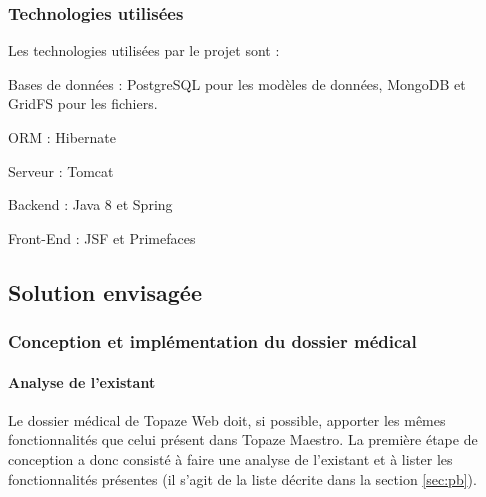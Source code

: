 \subsubsection{Technologies utilisées}
Les technologies utilisées par le projet sont :
\begin{sitemize}
\item Bases de données : \gls{PostgreSQL} pour les modèles de données, \gls{MongoDB} et \gls{GridFS} pour les fichiers.
\item ORM : \gls{Hibernate}\cite{bib:hibernate}
\item Serveur : \gls{Tomcat}
\item Backend : \gls{Java 8}\cite{bib:java8} et \gls{Spring}\cite{bib:spring}
\item Front-End : \gls{JSF}\cite{bib:jsf} et Primefaces
\end{sitemize} 

\subsection{Solution envisagée}
\subsubsection{Conception et implémentation du dossier médical}

\paragraph{Analyse de l'existant\\}
Le dossier médical de Topaze Web doit, si possible, apporter les mêmes fonctionnalités que celui présent dans Topaze Maestro.
La première étape de conception a donc consisté à faire une analyse de l’existant et à lister les fonctionnalités présentes (il s’agit de la liste décrite dans la section \ref{sec:pb}).

